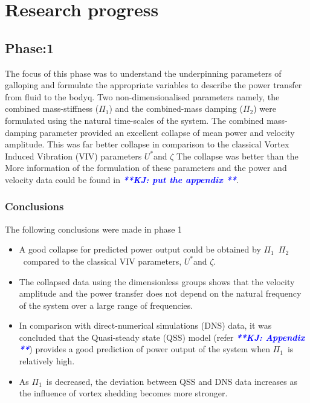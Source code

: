 \documentclass[authoryear,12pt]{article}
\newcommand{\ustar}{\ensuremath{U^{*}}}
\newcommand{\massstiff}{\ensuremath{\Pi_1}}
\newcommand{\massdamp}{\ensuremath{\Pi_2}}
\newcommand{\KJ}[1]{{\textcolor{blue}{{\bf{\it{ **KJ: #1 **}}}}}}
\begin{document}
\section{Research progress}

\subsection{Phase:1}
 
The focus of this phase was to understand the underpinning parameters of galloping and formulate the appropriate variables to describe the power transfer from fluid to the bodyq. Two non-dimensionalised parameters namely, the combined mass-stiffness (\massstiff) and the combined-mass damping (\massdamp) were formulated using the natural time-scales of the system. The combined mass-damping parameter provided an excellent collapse of mean power and velocity amplitude. This was far better collapse in comparison to the classical Vortex Induced Vibration (VIV) parameters \ustar and $\zeta$ The collapse was better than the  More information of the formulation of these parameters and the power and velocity data could be found in \KJ{put the appendix}.    

\subsubsection{Conclusions}

The following conclusions were made in phase 1 

\begin{itemize}
\item  A good collapse for predicted power output could be obtained by \massstiff \ \massdamp \ compared to the classical VIV parameters, \ustar and $\zeta$. 

\item The collapsed data using the dimensionless groups shows that the velocity amplitude and the power transfer does not depend on the natural frequency of the system over a large range of frequencies. 

\item In comparison with direct-numerical simulations (DNS) data, it was concluded that the Quasi-steady state (QSS) model (refer \KJ{Appendix}) provides a good prediction of power output of the system when \massstiff \ is relatively high.   

\item As \massstiff \ is decreased, the deviation between QSS and DNS data increases as the influence of vortex shedding becomes more stronger.   
\end{itemize}
\end{document}
